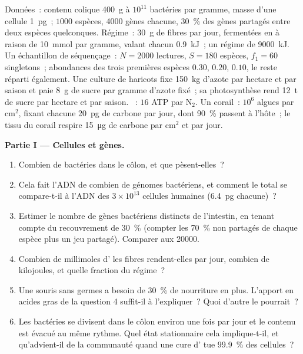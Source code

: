 \begin{problem}
\label{pb:b3:microbiomes:1}
Données~: contenu colique \qty{400}{g} à $10^{11}$ bactéries par
gramme, masse d'une cellule \qty{1}{pg}~; $1000$ espèces, \num{4000}
gènes chacune, \qty{30}{\%} des gènes partagés entre deux espèces
quelconques. Régime~: \qty{30}{g} de fibres par jour, fermentées en
 à raison de \qty{10}{mmol} par gramme,
valant chacun \qty{0.9}{kJ}~; un régime de \qty{9000}{kJ}. Un
échantillon de séquençage~: $N = 2000$ lectures, $S = 180$ espèces,
$f_{1} = 60$ singletons~; abondances des trois premières espèces
$0.30$, $0.20$, $0.10$, le reste réparti également. Une culture de
haricots fixe \qty{150}{kg} d'azote par hectare et par saison et paie
\qty{8}{g} de sucre par gramme d'azote fixé~; sa photosynthèse rend
\qty{12}{t} de sucre par hectare et par saison. ~: $16$ ATP
par N$_{2}$. Un corail~: $10^{6}$ algues par cm$^{2}$, fixant chacune
\qty{20}{pg} de carbone par jour, dont \qty{90}{\%} passent à l'hôte~;
le tissu du corail respire \qty{15}{\micro g} de carbone par cm$^{2}$
et par jour.

\medskip
\noindent\textbf{Partie I --- Cellules et gènes.}
\begin{enumerate}
  \item Combien de bactéries dans le côlon, et que pèsent-elles~?
  \item Cela fait l'ADN de combien de génomes bactériens, et comment le
        total se compare-t-il à l'ADN des $3\times 10^{13}$ cellules
        humaines (\qty{6.4}{pg} chacune)~?
  \item Estimer le nombre de gènes bactériens distincts de l'intestin,
        en tenant compte du recouvrement de \qty{30}{\%} (compter les
        \qty{70}{\%} non partagés de chaque espèce plus un jeu partagé).
        Comparer aux \num{20000}.
  \item Combien de millimoles d' les fibres
        rendent-elles par jour, combien de kilojoules, et quelle
        fraction du régime~?
  \item Une souris sans germes a besoin de \qty{30}{\%} de nourriture en
        plus. L'apport en acides gras de la question 4 suffit-il à
        l'expliquer~? Quoi d'autre le pourrait~?
  \item Les bactéries se divisent dans le côlon environ une fois par
        jour et le contenu est évacué au même rythme. Quel état
        stationnaire cela implique-t-il, et qu'advient-il de la
        communauté quand une cure d' tue \qty{99.9}{\%}
        des cellules~?
\end{enumerate}


\end{problem}
